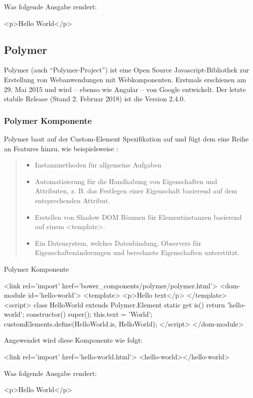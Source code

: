 Was folgende Ausgabe rendert:
\begin{JsCode}[numbers=none]
<p>Hello World</p>
\end{JsCode}

\subsection{Polymer }
Polymer (auch "`Polymer-Project"') ist eine Open Source Javascript-Bibliothek zur Erstellung von Webanwendungen mit Webkomponenten. Erstmals erschienen am 29. Mai 2015 und  wird -- ebenso wie Angular -- von Google entwickelt. Der letzte stabile Release (Stand 2. Februar 2018) ist die Version 2.4.0.

\subsubsection{Polymer Komponente}
Polymer baut auf der Custom-Element Spezifikation auf und fügt dem eine Reihe an Features hinzu, wie beispielsweise \cite{polymer-elements}:
\begin{quote}
	\begin{itemize}
		\item Instanzmethoden für allgemeine Aufgaben
		\item Automatisierung für die Handhabung von Eigenschaften und Attributen, z. B. das Festlegen einer Eigenschaft basierend auf dem entsprechenden Attribut.
		\item Erstellen von Shadow DOM Bäumen für Elementinstanzen basierend auf einem <template>.
		\item Ein Datensystem, welches Datenbindung, Observers für Eigenschaftenänderungen und berechnete Eigenschaften unterstützt.
	\end{itemize}
\end{quote}
\begin{program}[!htbp]
\caption{Polymer Komponente}
\begin{JsCode}
	<link rel='import' href='bower_components/polymer/polymer.html'>
	<dom-module id='hello-world'>
		<template>
			<p>Hello {{text}}</p>
		</template>
		<script>
		class HelloWorld extends Polymer.Element {
			static get is() {
				return 'hello-world';
			}
			constructor() {
				super();
				this.text = 'World';
			}
		}
		customElements.define(HelloWorld.is, HelloWorld);
		</script>
	</dom-module>
\end{JsCode}
\end{program}
Angewendet wird diese Komponente wie folgt:
\begin{JsCode}[numbers=none]
<link rel='import' href='hello-world.html'>
<hello-world></hello-world>
\end{JsCode}
Was folgende Ausgabe rendert:
\begin{JsCode}[numbers=none]
<p>Hello World</p>
\end{JsCode}

